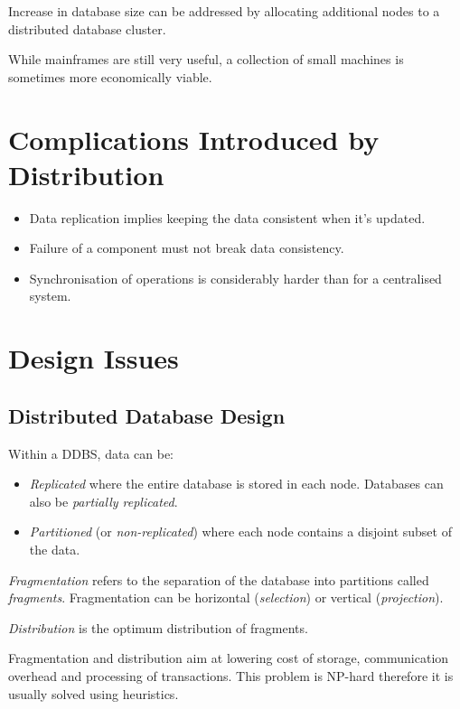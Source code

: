\documentclass[12pt]{article}
\begin{document}
Increase in database size can be addressed by allocating additional
 nodes to a distributed database cluster.

While mainframes are still very useful, a collection of small machines is sometimes more economically viable. 

\section{Complications Introduced by Distribution}

\begin{itemize}
	\item Data replication implies keeping the data consistent when it's updated.
	\item Failure of a component must not break data consistency.
	\item Synchronisation of operations is considerably harder than for a centralised system.
\end{itemize}

\section{Design Issues}

\subsection{Distributed Database Design}

Within a DDBS, data can be:
\begin{itemize}
	\item \textit{Replicated} where the entire database is stored in each node. Databases can also be \textit{partially replicated}.
	\item \textit{Partitioned} (or \textit{non-replicated}) where each node contains a disjoint subset of the data.
\end{itemize}

\textit{Fragmentation} refers to the separation of the database into partitions called \textit{fragments}. Fragmentation can be horizontal (\textit{selection}) or vertical (\textit{projection}).

\textit{Distribution} is the optimum distribution of fragments.

Fragmentation and distribution aim at lowering cost of storage, communication overhead and processing of transactions. This problem is NP-hard therefore it is usually solved using heuristics.
\end{document}

